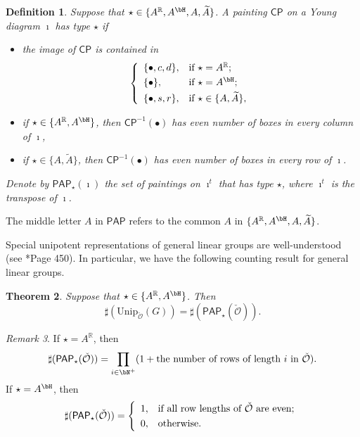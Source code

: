 \documentclass[12pt,a4paper]{amsart}
\newcommand{\CO}{{\mathcal {O}}}
\newcommand{\CP}{{\mathcal {P}}}
\newcommand{\R}{\mathbb R}
\numberwithin{equation}{section}
\newtheorem{thm}{Theorem}[section]
\newtheorem{defn}[thm]{Definition}
\theoremstyle{remark}
\newtheorem{remark}[thm]{Remark}
\def\Unip{\mathrm{Unip}}
\def\CP{\mathsf{CP}}
\def\PAP{\mathsf{PAP}}
\begin{document}
\begin{defn}\label{defpbp0}
  Suppose that $\star\in \{A^\R, A^\bH, A, \widetilde A\}$. A painting $\CP$ on a Young diagram
  $\imath$ has type $\star$ if
  \begin{itemize}
    \item the image of $\CP$ is contained in
          \[
          \left\{
          \begin{array}{ll}
            \{\bullet, c, d\}, &\hbox{if $\star=A^\R$}; \smallskip\\
            \{\bullet\}, &\hbox{if $\star=A^\bH$}; \smallskip\\
            \{\bullet, s, r\}, &\hbox{if $\star\in \{A, \widetilde A\}$},            \end{array}
        \right.
          \]
    \item if $\star\in \{A^\R, A^\bH\}$, then $\CP^{-1}(\bullet)$ has even number of
          boxes in every column of $\imath$,
    \item if $\star\in \{A, \widetilde A\}$, then $\CP^{-1}(\bullet)$ has even number of boxes in
          every row of $\imath$.
  \end{itemize}
  Denote by $\PAP_\star(\imath)$ the set of paintings on $\imath^{t}$ that has type $\star$, where $\imath^{t}$
  is the transpose of $\imath$.
   \end{defn}


The middle letter $A$ in $\PAP$ refers to the common $A$ in $\{A^\R, A^\bH, A, \widetilde A\}$.

Special unipotent representations of general linear groups are
well-understood (see \cite{V.GL}*{Page 450}). In particular, we have the following counting result for general linear groups.

\begin{thm}\label{GLcase}
 Suppose that  $\star\in\{A^\R, A^\bH\}$. Then
  \[
    \sharp(\Unip_{\check \CO}(G))=        \sharp(\PAP_\star(\check \CO)).
    \]

\end{thm}
\begin{remark}
  If $\star=A^\R$, then
  \[
    \sharp(\PAP_\star(\check \CO))=\prod_{i\in \bN^+} (1+\textrm{the
      number of rows of length $i$ in $\check \CO$}).
  \]
  If $\star=A^\bH$, then
  \[
    \sharp(\PAP_\star(\check \CO))= \left\{
      \begin{array}{ll}
        1, &\hbox{if all row lengths of $\check \CO$ are even}; \smallskip\\
        0, &\hbox{otherwise}.  \end{array}
    \right.
  \]

\end{remark}
\end{document}
